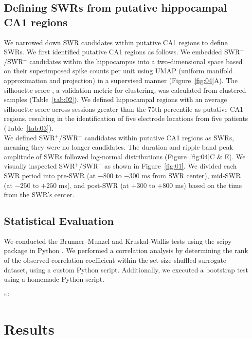 \documentclass[final,3p,times,twocolumn]{elsarticle}
\newcommand{\REDSTARTS}{\color{red}}
\newcommand{\GREENENDS}{\color{black}}
\begin{document}
\begin{abstract\GREENENDS \REDSTARTS ll_Tables}
\subsection{Defining SWRs from putative hippocampal CA1 regions}
We narrowed down SWR candidates within putative CA1 regions to define SWRs. We first identified putative CA1 regions as follows. We embedded SWR$^+$/SWR$^-$ candidates within the hippocampus into a two-dimensional space based on their superimposed spike counts per unit using UMAP (uniform manifold approximation and projection) \cite{mcinnes_umap_2018} in a supervised manner (Figure~\ref{fig:04}A). The silhouette score \cite{rousseeuw_silhouettes_1987}, a validation metric for clustering, was calculated from clustered samples (Table~\ref{tab:02}). We defined hippocampal regions with an average silhouette score across sessions greater than the 75th percentile as putative CA1 regions, resulting in the identification of five electrode locations from five patients (Table~\ref{tab:03}).
\\
\indent
We defined SWR$^+$/SWR$^-$ candidates within putative CA1 regions as SWRs, meaning they were no longer candidates. The duration and ripple band peak amplitude of SWRs followed log-normal distributions (Figure~\ref{fig:04}C \& E). We visually inspected SWR$^+$/SWR$^-$ as shown in Figure~\ref{fig:01}. We divided each SWR period into pre-SWR (at $-800$ to $-300$ ms from SWR center), mid-SWR (at $-250$ to $+250$ ms), and post-SWR (at $+300$ to $+800$ ms) based on the time from the SWR's center.

\subsection{Statistical Evaluation}
We conducted the Brunner--Munzel and Kruskal-Wallis tests using the scipy package in Python \cite{virtanen_scipy_2020}. We performed a correlation analysis by determining the rank of the observed correlation coefficient within the set-size-shuffled surrogate dataset, using a custom Python script. Additionally, we executed a bootstrap test using a homemade Python script.

\label{sec:methods}
```%
\section{Results}

\end{abstract\GREENENDS \REDSTARTS ll_Tables}
\end{document}
